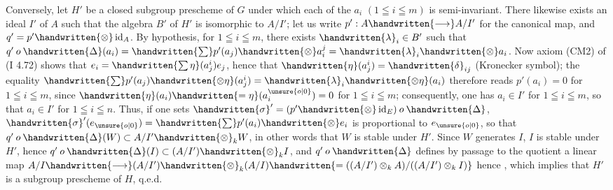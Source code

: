 Conversely, let $H'$ be a closed subgroup prescheme of $G$ under which each of the $a_i$ $(1\leqq i\leqq m)$ is semi-invariant.  There likewise exists an ideal $I'$ of $A$ such that the algebra $B'$ of $H'$ is isomorphic to $A/I'$; let us write $p':A\handwritten{\longrightarrow}A/I'$ for the canonical map, and $q'=p'\handwritten{\otimes}\operatorname{id}_A$. By hypothesis, for $1\leqq i\leqq m$, there exists $\handwritten{\lambda}_i\in B'$ such that $q'\mathbin{o}\handwritten{\Delta}(a_i)=\handwritten{\sum}p'(a_j)\handwritten{\otimes}a_i^j=\handwritten{\lambda}_i\handwritten{\otimes}a_i$. Now axiom (CM2) of (I 4.72) shows that $e_i=\handwritten{\sum\eta}(a_j^i)e_j$, hence that $\handwritten{\eta}(a_j^i)=\handwritten{\delta}_{ij}$ (Kronecker symbol); the equality $\handwritten{\sum}p'(a_j)\handwritten{\otimes\eta}(a_j^i)=\handwritten{\lambda}_i\handwritten{\otimes\eta}(a_i)$ therefore reads $p'(a_i)=0$ for $1\leqq i\leqq m$, since $\handwritten{\eta}(a_i)\handwritten{=\eta}(a_i^{\unsure{o|0}})=0$ for $1\leqq i\leqq m$; consequently, one has $a_i\in I'$ for $1\leqq i\leqq m$, so that $a_i\in I'$ for $1\leqq i\leqq n$. Thus, if one sets $\handwritten{\sigma}'=(p'\handwritten{\otimes}\operatorname{id}_E)\mathbin{o}\handwritten{\Delta}$, $\handwritten{\sigma}'(e_{\unsure{o|0}})=\handwritten{\sum}p'(a_i)\handwritten{\otimes}e_i$ is proportional to $e_{\unsure{o|0}}$, so that $q'\mathbin{o}\handwritten{\Delta}(W)\subset A/I'\handwritten{\otimes}_k W$, in other words that $W$ is stable under $H'$. Since $W$ generates $I$, $I$ is stable under $H'$, hence $q'\mathbin{o}\handwritten{\Delta}(I)\subset(A/I')\handwritten{\otimes}_k I$, and $q'\mathbin{o}\handwritten{\Delta}$ defines by passage to the quotient a linear map $A/I\handwritten{\longrightarrow}(A/I')\handwritten{\otimes}_k(A/I)\handwritten{=((A/I')\otimes_k A)/((A/I')\otimes_k I)}$ hence , which implies that $H'$ is  a subgroup prescheme of $H$, q.e.d.

